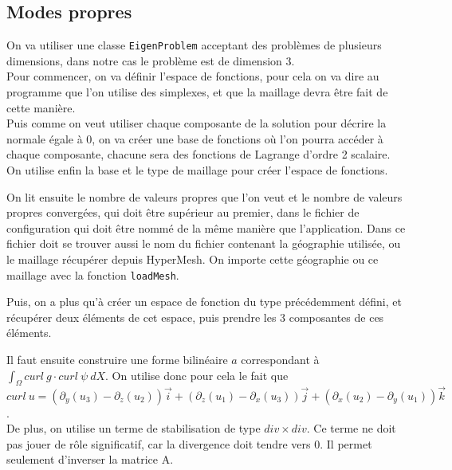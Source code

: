 \subsection{Modes propres}

\iffalse

On va utiliser une classe \texttt{EigenProblem} acceptant des problèmes de plusieurs dimensions, dans notre cas le problème est de dimension 3.\\
Pour commencer, on va définir l'espace de fonctions, pour cela on va dire au programme que l'on utilise des simplexes, et que la maillage devra être fait de cette manière.\\
Puis comme on veut utiliser chaque composante de la solution pour décrire la normale égale à 0, on va créer une base de fonctions où l'on pourra accéder à chaque composante, chacune sera des fonctions de Lagrange d'ordre 2 scalaire.\\
On utilise enfin la base et le type de maillage pour créer l'espace de fonctions.



On lit ensuite le nombre de valeurs propres que l'on veut et le nombre de valeurs propres convergées, qui doit être supérieur au premier, dans le fichier de configuration qui doit être nommé de la même manière que l'application. Dans ce fichier doit se trouver aussi le nom du fichier contenant la géographie utilisée, ou le maillage récupérer depuis HyperMesh. On importe cette géographie ou ce maillage avec la fonction \texttt{loadMesh}.



Puis, on a plus qu'à créer un espace de fonction du type précédemment défini, et récupérer deux éléments de cet espace, puis prendre les 3 composantes de ces éléments.



Il faut ensuite construire une forme bilinéaire $a$ correspondant à $\int_\Omega curl\ g\cdot curl\ \psi\ dX$. On utilise donc pour cela le fait que $curl\ u = (\partial_y(u_3)-\partial_z(u_2))\vec{i} + (\partial_z(u_1) - \partial_x(u_3))\vec{j} + (\partial_x(u_2)-\partial_y(u_1))\vec{k}$.\\
De plus, on utilise un terme de stabilisation de type $div \times div$. Ce terme ne doit pas jouer de rôle significatif, car la divergence doit tendre vers 0. Il permet seulement d'inverser la matrice A.

